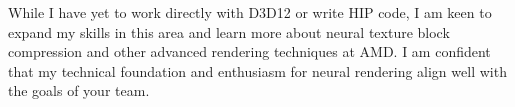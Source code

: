 While I have yet to work directly with D3D12 or write HIP code, 
I am keen to expand my skills in this area and learn more about neural texture block compression 
and other advanced rendering techniques at AMD. 
I am confident that my technical foundation and enthusiasm for neural rendering align 
well with the goals of your team.